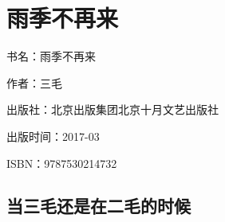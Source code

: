 


\section{雨季不再来}


\par 书名：雨季不再来
\par 作者：三毛
\par 出版社：北京出版集团北京十月文艺出版社
\par 出版时间：2017-03
\par ISBN：9787530214732









\subsection{当三毛还是在二毛的时候}


